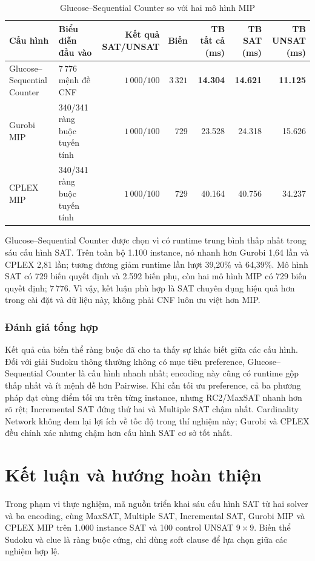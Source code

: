 \documentclass[a4paper,fleqn]{cas-sc}
\begin{document}
\begin{table}[htbp]
\centering
\caption{Glucose--Sequential Counter so với hai mô hình MIP}
\label{tab:sat-vs-mip}
\scriptsize
\begin{tabularx}{\linewidth}{@{}lXrrrrr@{}}
\toprule
Cấu hình & Biểu diễn đầu vào & Kết quả SAT/UNSAT & Biến & TB tất cả (ms) & TB SAT (ms) & TB UNSAT (ms)\\
\midrule
Glucose--Sequential Counter & $7\,776$ mệnh đề CNF & $1\,000/100$ & $3\,321$ & \textbf{14.304} & \textbf{14.621} & \textbf{11.125}\\
Gurobi MIP & 340/341 ràng buộc tuyến tính & $1\,000/100$ & 729 & 23.528 & 24.318 & 15.626\\
CPLEX MIP & 340/341 ràng buộc tuyến tính & $1\,000/100$ & 729 & 40.164 & 40.756 & 34.237\\
\bottomrule
\end{tabularx}
\end{table}

Glucose--Sequential Counter được chọn vì có runtime trung bình thấp nhất trong sáu cấu hình SAT. Trên toàn bộ 1.100 instance, nó nhanh hơn Gurobi 1,64 lần và CPLEX 2,81 lần; tương đương giảm runtime lần lượt 39,20\% và 64,39\%. Mô hình SAT có 729 biến quyết định và 2.592 biến phụ, còn hai mô hình MIP có 729 biến quyết định; $7\,776$. Vì vậy, kết luận phù hợp là SAT chuyên dụng hiệu quả hơn trong cài đặt và dữ liệu này, không phải CNF luôn ưu việt hơn MIP.

\subsubsection{Đánh giá tổng hợp}

Kết quả của biến thể ràng buộc đã cho ta thấy sự khác biết giữa các cấu hình. Đối với giải Sudoku thông thường không có mục tiêu preference, Glucose--Sequential Counter là cấu hình nhanh nhất; encoding này cũng có runtime gộp thấp nhất và ít mệnh đề hơn Pairwise. Khi cần tối ưu preference, cả ba phương pháp đạt cùng điểm tối ưu trên từng instance, nhưng RC2/MaxSAT nhanh hơn rõ rệt; Incremental SAT đứng thứ hai và Multiple SAT chậm nhất. Cardinality Network không đem lại lợi ích về tốc độ trong thí nghiệm này; Gurobi và CPLEX đều chính xác nhưng chậm hơn cấu hình SAT cơ sở tốt nhất.

\section{Kết luận và hướng hoàn thiện}\label{sec:conclusion}
Trong phạm vi thực nghiệm, mã nguồn triển khai sáu cấu hình SAT từ hai solver và ba encoding, cùng MaxSAT, Multiple SAT, Incremental SAT, Gurobi MIP và CPLEX MIP trên 1.000 instance SAT và 100 control UNSAT $9\times9$. Biến thể Sudoku và clue là ràng buộc cứng, chỉ dùng soft clause để lựa chọn giữa các nghiệm hợp lệ.
\end{document}
